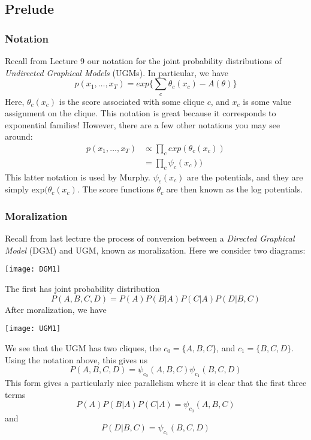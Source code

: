 \documentclass{article}
\begin{document}

\subsection{Prelude}
\subsubsection{Notation}
\label{sec:l10notation}
Recall from Lecture 9 our notation for the joint probability distributions of \textit{Undirected Graphical Models} (UGMs). In particular, we have
\[
p(x_1,\ldots,x_T)=exp\{\sum\limits_c \theta_c(x_c) - A(\theta)\}
\]
Here, $\theta_c(x_c)$ is the score associated with some clique $c$, and $x_c$ is some value assignment on the clique. This notation is great because it corresponds to exponential families! However, there are a few other notations you may see around:
\begin{align*}
p(x_1,\ldots,x_T) &\propto \prod\limits_c exp(\theta_c(x_c))\\
&= \prod\limits_c \psi_c(x_c))
\end{align*}
This latter notation is used by Murphy. $\psi_c(x_c)$ are the potentials, and they are simply exp$(\theta_c(x_c)$. The score functions $\theta_c$ are then known as the log potentials.
\subsubsection{Moralization}
Recall from last lecture the process of conversion between a \textit{Directed Graphical Model} (DGM) and UGM, known as moralization. Here we consider two diagrams:
\begin{center}
\texttt{[image: DGM1]}
\end{center}
The first has joint probability distribution
\[
P(A,B,C,D)=P(A)P(B|A)P(C|A)P(D|B,C)
\]
After moralization, we have
\begin{center}
\texttt{[image: UGM1]}
\end{center}
We see that the UGM has two cliques, the $c_0=\{A,B,C\}$, and $c_1=\{B,C,D\}$.
Using the notation above, this gives us
\[
P(A,B,C,D) = \psi_{c_0}(A,B,C)\psi_{c_1}(B,C,D)
\]
This form gives a particularly nice parallelism where it is clear that the first three terms 
\[
P(A)P(B|A)P(C|A)=\psi_{c_0}(A,B,C)
\]
and
\[
P(D|B,C)=\psi_{c_1}(B,C,D)
\]
\end{document}
